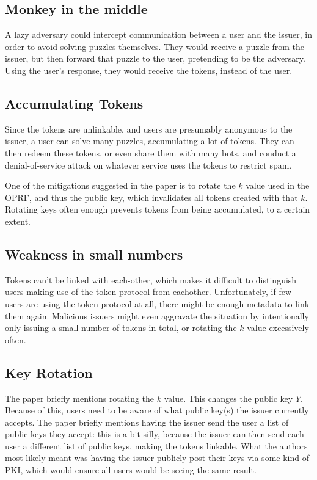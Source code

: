 \documentclass[9pt, a4paper]{article}
\begin{document}
\subsection{Monkey in the middle}

A lazy adversary could intercept communication between a user and
the issuer, in order to avoid solving puzzles themselves. They
would receive a puzzle from the issuer, but then forward that puzzle
to the user, pretending to be the adversary. Using the user's response,
they would receive the tokens, instead of the user.

\subsection{Accumulating Tokens}

Since the tokens are unlinkable,
and users are presumably anonymous to the issuer, a user can solve
many puzzles, accumulating a lot of tokens. They can then redeem
these tokens, or even share them with many bots, and conduct
a denial-of-service attack on whatever service uses the tokens
to restrict spam.

One of the mitigations suggested in the paper is to rotate the $k$
value used in the OPRF, and thus the public key, which invalidates
all tokens created with that $k$. Rotating keys often enough
prevents tokens from being accumulated, to a certain extent.

\subsection{Weakness in small numbers}

Tokens can't be linked with each-other, which makes it difficult
to distinguish users making use of the token protocol from eachother.
Unfortunately, if few users are using the token protocol at all,
there might be enough metadata to link them again. Malicious issuers
might even aggravate the situation by intentionally only issuing
a small number of tokens in total, or rotating the $k$ value excessively
often.

\subsection{Key Rotation}

The paper briefly mentions rotating the $k$ value. This changes
the public key $Y$. Because of this, users need to be aware of
what public key(s) the issuer currently accepts. The paper briefly
mentions having the issuer send the user a list of public keys they accept:
this is a bit silly, because the issuer can then send each user
a different list of public keys, making the tokens linkable. What the
authors most likely meant was having the issuer publicly post
their keys via some kind of PKI, which would ensure all users would
be seeing the same result.


\footnotesize 
\end{document}

